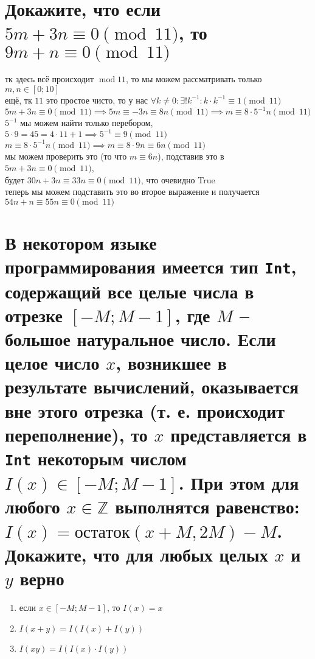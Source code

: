 \documentclass{article}
\newcommand{\ds}{\displaystyle}
\newcommand{\Mod}[1]{\pmod{#1}}
\begin{document}
  \section{Докажите, что если $5m+3n \equiv 0 \Mod{11}$, то $9m+n \equiv 0 \Mod{11}$}
  тк здесь всё происходит $\operatorname{mod}11$, то мы можем рассматривать только $m,n \in [0;10]$ \\
  ещё, тк $11$ это простое чисто, то у нас $\ds \forall k \neq 0: \exists!k^{-1}: k \cdot k^{-1} \equiv 1 \Mod{11}$ \\
  $\ds 5m+3n \equiv 0 \Mod{11} \implies 5m \equiv -3n \equiv 8n \Mod{11} \implies m \equiv 8 \cdot 5^{-1}n \Mod{11}$ \\
  $5^{-1}$ мы можем найти только перебором, $5 \cdot 9 = 45 = 4 \cdot 11 + 1 \implies 5^{-1} \equiv 9 \Mod{11}$ \\
  $\ds m \equiv 8 \cdot 5^{-1}n \Mod{11} \implies m \equiv 8 \cdot 9 n \equiv 6n \Mod{11}$ \\
  мы можем проверить это (то что $m \equiv 6n$), подставив это в $5m+3n \equiv 0 \Mod{11}$, \\
  будет $30n+3n \equiv 33n \equiv 0 \Mod{11}$, что очевидно True \\
  теперь мы можем подставить это во второе выражение и получается $54n+n \equiv 55n \equiv 0 \Mod{11}$

  \section{В некотором языке программирования имеется тип \texttt{Int}, содержащий все целые числа в отрезке $[-M; M-1]$, где $M$ -- большое натуральное число. Если целое число $x$, возникшее в результате вычислений, оказывается вне этого отрезка (т. е. происходит переполнение), то $x$ представляется в \texttt{Int} некоторым числом $I(x) \in [-M; M-1]$. При этом для любого $x \in \mathbb{Z}$ выполнятся равенство: $ I(x) = остаток(x+M, 2M) - M $. Докажите, что для любых целых $x$ и $y$ верно}
  \begin{center}
    \begin{varwidth}{\textwidth}
      \begin{enumerate}
        \item если $x \in [-M; M-1]$, то $I(x) = x$
        \item $I(x+y) = I(I(x)+I(y))$
        \item $I(xy) = I(I(x) \cdot I(y))$
      \end{enumerate}
    \end{varwidth}
  \end{center}
\end{document}

